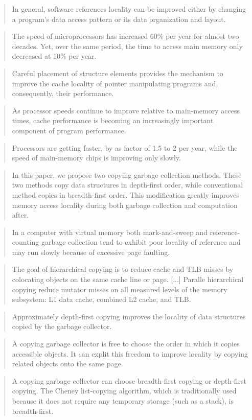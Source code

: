 \documentclass[a4paper,oneside]{memoir}
\begin{document}
\blockquote{In general, software references locality can be improved either by
changing a program's data access pattern or its data organization and layout.}
\cite{Chilimbi:1999}

\blockquote{The speed of microprocessors has increased 60\% per year for almost
two decades. Yet, over the same period, the time to access main memory only
decreased at 10\% per year.}
\cite{Chilimbi:1999}

\blockquote{Careful placement of structure elements provides the mechanism to
improve the cache locality of pointer manipulating programs and, consequently,
their performance.}
\cite{Chilimbi:1999}

\blockquote{As processor speeds continue to improve relative to main-memory
access times, cache performance is becoming an increasingly important component
of program performance.}
\cite{Reinhold:1994}

\blockquote{Processors are getting faster, by as factor of 1.5 to 2 per year,
while the speed of main-memory chips is improving only slowly.}
\cite{Reinhold:1994}

\blockquote{In this paper, we propose two copying garbage collection methods.
These two methods copy data structures in depth-first order, while conventional
method copies in breadth-first order. This modification greatly improves memory
access locality during both garbage collection and computation after.\cite{Nakashima:1995}}

\blockquote{In a computer with virtual memory both mark-and-sweep and
reference-counting garbage collection tend to exhibit poor locality of reference
and may run slowly because of excessive page faulting.}
\cite{Chase:1987}

\blockquote{The goal of hierarchical copying is to reduce cache and TLB misses
by colocating objects on the same cache line or page. [...] Paralle hierarchical
copying reduce mutator misses on all measured levels of the memory subsystem:
L1 data cache, combined L2 cache, and TLB.\cite{Siegwart:2006}}


\blockquote{Approximately depth-first copying improves the locality of
data structures copied by the garbage collector.}
\cite{Moon:1984}

\blockquote{A copying garbage collector is free to choose the order in which
it copies accessible objects. It can explit this freedom to improve locality by
copying related objects onto the same page.}
\cite{Moon:1984}

\blockquote{A copying garbage collector can choose breadth-first copying or
depth-first copying. The Cheney list-copying algorithm, which is traditionally
used because it does not require any temporary storage (such as a stack), is
breadth-first.\cite{Moon:1984}}
\end{document}
